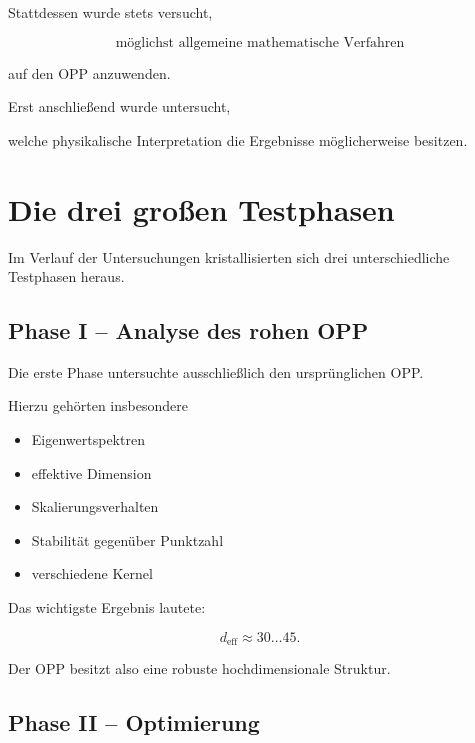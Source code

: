 Stattdessen wurde stets versucht,

\[
\boxed{
\text{möglichst allgemeine mathematische Verfahren}
}
\]

auf den OPP anzuwenden.

Erst anschließend wurde untersucht,

welche physikalische Interpretation die Ergebnisse möglicherweise besitzen.


\section*{Die drei großen Testphasen}

Im Verlauf der Untersuchungen kristallisierten sich drei unterschiedliche Testphasen heraus.

\subsection*{Phase I – Analyse des rohen OPP}

Die erste Phase untersuchte ausschließlich den ursprünglichen OPP.

Hierzu gehörten insbesondere

\begin{itemize}

\item Eigenwertspektren

\item effektive Dimension

\item Skalierungsverhalten

\item Stabilität gegenüber Punktzahl

\item verschiedene Kernel

\end{itemize}

Das wichtigste Ergebnis lautete:

\[
d_{\mathrm{eff}}
\approx
30\ldots45.
\]

Der OPP besitzt also eine robuste hochdimensionale Struktur.


\subsection*{Phase II – Optimierung}

